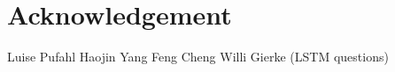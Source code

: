 %
\chapter*{Acknowledgement}
\label{sec:acknowledgement}
\vspace*{-10mm}

Luise Pufahl
Haojin Yang
Feng Cheng
Willi Gierke (LSTM questions)